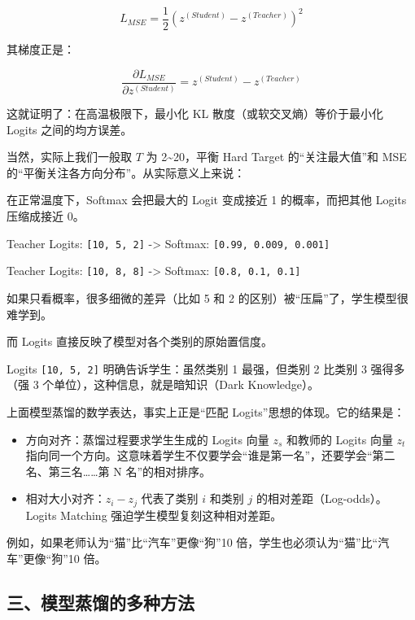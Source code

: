 \[
L_{MSE} = \frac{1}{2}\left(z^{(Student)} - z^{(Teacher)}\right)^2
\]

其梯度正是：

\[
\frac{\partial L_{MSE}}{\partial z^{(Student)}} = z^{(Student)} - z^{(Teacher)}
\]

这就证明了：在高温极限下，最小化 KL 散度（或软交叉熵）等价于最小化 Logits 之间的均方误差。

当然，实际上我们一般取 \(T\) 为 2\textasciitilde20，平衡 Hard Target 的``关注最大值''和 MSE 的``平衡关注各方向分布''。从实际意义上来说：

在正常温度下，Softmax 会把最大的 Logit 变成接近 1 的概率，而把其他 Logits 压缩成接近 0。

Teacher Logits: \texttt{{[}10,\ 5,\ 2{]}} -\textgreater{} Softmax: \texttt{{[}0.99,\ 0.009,\ 0.001{]}}

Teacher Logits: \texttt{{[}10,\ 8,\ 8{]}} -\textgreater{} Softmax: \texttt{{[}0.8,\ 0.1,\ 0.1{]}}

如果只看概率，很多细微的差异（比如 5 和 2 的区别）被``压扁''了，学生模型很难学到。

而 Logits 直接反映了模型对各个类别的原始置信度。

Logits \texttt{{[}10,\ 5,\ 2{]}} 明确告诉学生：虽然类别 1 最强，但类别 2 比类别 3 强得多（强 3 个单位），这种信息，就是暗知识（Dark Knowledge）。

上面模型蒸馏的数学表达，事实上正是``匹配 Logits''思想的体现。它的结果是：

\begin{itemize}
\tightlist
\item
  方向对齐：蒸馏过程要求学生生成的 Logits 向量 \(z_s\) 和教师的 Logits 向量 \(z_t\) 指向同一个方向。这意味着学生不仅要学会``谁是第一名''，还要学会``第二名、第三名\ldots\ldots 第 N 名''的相对排序。
\item
  相对大小对齐：\(z_i - z_j\) 代表了类别 \(i\) 和类别 \(j\) 的相对差距（Log-odds）。Logits Matching 强迫学生模型复刻这种相对差距。
\end{itemize}

例如，如果老师认为``猫''比``汽车''更像``狗''10 倍，学生也必须认为``猫''比``汽车''更像``狗''10 倍。

\hypertarget{ux4e09ux6a21ux578bux84b8ux998fux7684ux591aux79cdux65b9ux6cd5}{%
\subsection{三、模型蒸馏的多种方法}\label{ux4e09ux6a21ux578bux84b8ux998fux7684ux591aux79cdux65b9ux6cd5}}

